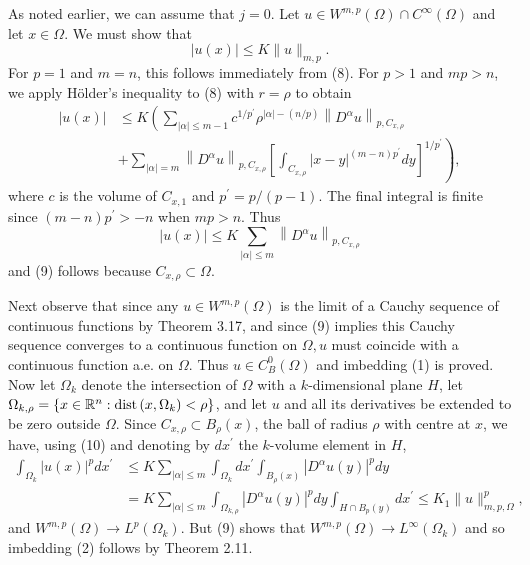 \begin{para}
  As noted earlier, we can assume that $j=0$. Let $u \in W^{m, p}(\Omega) \cap C^{\infty}(\Omega)$ 
  and let $x \in \Omega$. We must show that
  \[
  |u(x)| \leq K\|u\|_{m, p} .
  \]
  For $p=1$ and $m=n$, this follows immediately from (8). For $p>1$ and $m p>n$,
  we apply Hölder's inequality to (8) with $r=\rho$ to obtain
  \[
  \begin{aligned}
  |u(x)| & \leq K\left(\sum_{|\alpha| \leq m-1} c^{1 / p^{\prime}} \rho^{|\alpha|-(n / p)}\left\|D^\alpha u\right\|_{p, C_{x, \rho}}\right. \\
  & \left.+\sum_{|\alpha|=m}\left\|D^\alpha u\right\|_{p, C_{x, \rho}}\left[\int_{C_{x, \rho}}|x-y|^{(m-n) p^{\prime}} d y\right]^{1 / p^{\prime}}\right),
  \end{aligned}
  \]
  where $c$ is the volume of $C_{x, 1}$ and $p^{\prime}=p /(p-1)$. The final integral is finite since $(m-n) p^{\prime}>-n$ when $m p>n$. Thus
  \[
  |u(x)| \leq K \sum_{|\alpha| \leq m}\left\|D^\alpha u\right\|_{p, C_{x, \rho}}
  \]
  and (9) follows because $C_{x, \rho} \subset \Omega$.
  
  Next observe that since any $u \in W^{m, p}(\Omega)$ is the limit of a Cauchy sequence of continuous functions 
  by Theorem 3.17, and since (9) implies this Cauchy sequence converges to a continuous function on $\Omega, u$ 
  must coincide with a continuous function a.e. on $\Omega$. Thus $u \in C_B^0(\Omega)$ and imbedding (1) is 
  proved.
  Now let $\Omega_k$ denote the intersection of $\Omega$ with a $k$-dimensional plane $H$,
  let $\Omega_{k, \rho}=\left\{x \in \mathbb{R}^n: \operatorname{dist}\left(x, \Omega_k\right)<\rho\right\}$, 
  and let $u$ and all its derivatives be extended to be zero outside $\Omega$.
  Since $C_{x, \rho} \subset B_\rho(x)$, the ball of radius $\rho$ with centre at $x$,
  we have, using (10) and denoting by $d x^{\prime}$ the $k$-volume element in $H$,
  \[
  \begin{aligned}
  \int_{\Omega_k}|u(x)|^p d x^{\prime} & \leq K \sum_{|\alpha| \leq m} \int_{\Omega_k} d x^{\prime} \int_{B_\rho(x)}\left|D^\alpha u(y)\right|^p d y \\
  & =K \sum_{|\alpha| \leq m} \int_{\Omega_{k, \rho}}\left|D^\alpha u(y)\right|^p d y \int_{H \cap B_p(y)} d x^{\prime} \leq K_1\|u\|_{m, p, \Omega}^p,
  \end{aligned}
  \]
  and $W^{m,p}(\Omega) \rightarrow L^p\left(\Omega_k\right)$. But (9) shows that $W^{m,p}(\Omega) \rightarrow L^{\infty}\left(\Omega_k\right)$ and so imbedding (2) follows by Theorem 2.11.
\end{para}

